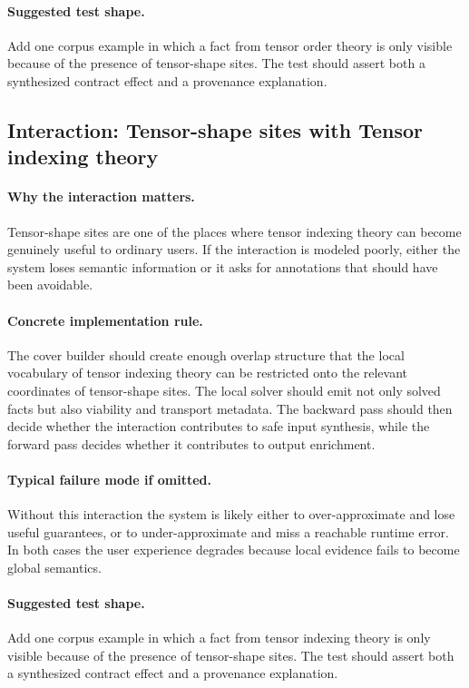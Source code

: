 \documentclass[11pt]{report}
\theoremstyle{definition}
\theoremstyle{plain}
\begin{document}
\paragraph{Suggested test shape.}
Add one corpus example in which a fact from tensor order theory is only
visible because of the presence of tensor-shape sites. The test should
assert both a synthesized contract effect and a provenance explanation.

\subsection{Interaction: Tensor-shape sites with Tensor indexing theory}

\paragraph{Why the interaction matters.}
Tensor-shape sites are one of the places where tensor indexing theory can become
genuinely useful to ordinary users. If the interaction is modeled poorly,
either the system loses semantic information or it asks for annotations that
should have been avoidable.

\paragraph{Concrete implementation rule.}
The cover builder should create enough overlap structure that the local
vocabulary of tensor indexing theory can be restricted onto the relevant
coordinates of tensor-shape sites. The local solver should emit not only
solved facts but also viability and transport metadata. The backward pass
should then decide whether the interaction contributes to safe input
synthesis, while the forward pass decides whether it contributes to output
enrichment.

\paragraph{Typical failure mode if omitted.}
Without this interaction the system is likely either to over-approximate and
lose useful guarantees, or to under-approximate and miss a reachable runtime
error. In both cases the user experience degrades because local evidence
fails to become global semantics.

\paragraph{Suggested test shape.}
Add one corpus example in which a fact from tensor indexing theory is only
visible because of the presence of tensor-shape sites. The test should
assert both a synthesized contract effect and a provenance explanation.
\end{document}
